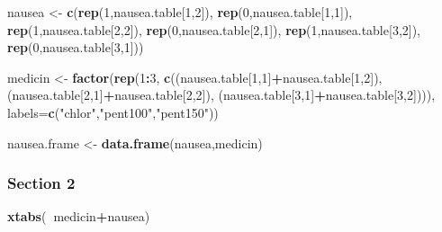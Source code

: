 \documentclass[]{article}
\newenvironment{Shaded}{\begin{snugshade}}{\end{snugshade}}
\newcommand{\KeywordTok}[1]{\textcolor[rgb]{0.13,0.29,0.53}{\textbf{#1}}}
\newcommand{\DataTypeTok}[1]{\textcolor[rgb]{0.13,0.29,0.53}{#1}}
\newcommand{\DecValTok}[1]{\textcolor[rgb]{0.00,0.00,0.81}{#1}}
\newcommand{\StringTok}[1]{\textcolor[rgb]{0.31,0.60,0.02}{#1}}
\newcommand{\OperatorTok}[1]{\textcolor[rgb]{0.81,0.36,0.00}{\textbf{#1}}}
\newcommand{\NormalTok}[1]{#1}
\begin{document}
\begin{Shaded}
\begin{Highlighting}[]
\NormalTok{nausea <-}\StringTok{ }\KeywordTok{c}\NormalTok{(}\KeywordTok{rep}\NormalTok{(}\DecValTok{1}\NormalTok{,nausea.table[}\DecValTok{1}\NormalTok{,}\DecValTok{2}\NormalTok{]), }\KeywordTok{rep}\NormalTok{(}\DecValTok{0}\NormalTok{,nausea.table[}\DecValTok{1}\NormalTok{,}\DecValTok{1}\NormalTok{]),}
            \KeywordTok{rep}\NormalTok{(}\DecValTok{1}\NormalTok{,nausea.table[}\DecValTok{2}\NormalTok{,}\DecValTok{2}\NormalTok{]), }\KeywordTok{rep}\NormalTok{(}\DecValTok{0}\NormalTok{,nausea.table[}\DecValTok{2}\NormalTok{,}\DecValTok{1}\NormalTok{]),}
            \KeywordTok{rep}\NormalTok{(}\DecValTok{1}\NormalTok{,nausea.table[}\DecValTok{3}\NormalTok{,}\DecValTok{2}\NormalTok{]), }\KeywordTok{rep}\NormalTok{(}\DecValTok{0}\NormalTok{,nausea.table[}\DecValTok{3}\NormalTok{,}\DecValTok{1}\NormalTok{]))}

\NormalTok{medicin <-}\StringTok{ }\KeywordTok{factor}\NormalTok{(}\KeywordTok{rep}\NormalTok{(}\DecValTok{1}\OperatorTok{:}\DecValTok{3}\NormalTok{, }\KeywordTok{c}\NormalTok{((nausea.table[}\DecValTok{1}\NormalTok{,}\DecValTok{1}\NormalTok{]}\OperatorTok{+}\NormalTok{nausea.table[}\DecValTok{1}\NormalTok{,}\DecValTok{2}\NormalTok{]),}
\NormalTok{                             (nausea.table[}\DecValTok{2}\NormalTok{,}\DecValTok{1}\NormalTok{]}\OperatorTok{+}\NormalTok{nausea.table[}\DecValTok{2}\NormalTok{,}\DecValTok{2}\NormalTok{]),}
\NormalTok{                             (nausea.table[}\DecValTok{3}\NormalTok{,}\DecValTok{1}\NormalTok{]}\OperatorTok{+}\NormalTok{nausea.table[}\DecValTok{3}\NormalTok{,}\DecValTok{2}\NormalTok{]))), }
                  \DataTypeTok{labels=}\KeywordTok{c}\NormalTok{(}\StringTok{"chlor"}\NormalTok{,}\StringTok{"pent100"}\NormalTok{,}\StringTok{"pent150"}\NormalTok{))}

\NormalTok{nausea.frame <-}\StringTok{ }\KeywordTok{data.frame}\NormalTok{(nausea,medicin)}
\end{Highlighting}
\end{Shaded}

\subsubsection{Section 2}\label{section-2-2}

\begin{Shaded}
\begin{Highlighting}[]
\KeywordTok{xtabs}\NormalTok{(}\OperatorTok{~}\NormalTok{medicin}\OperatorTok{+}\NormalTok{nausea)}
\end{Highlighting}
\end{Shaded}
\end{document}
